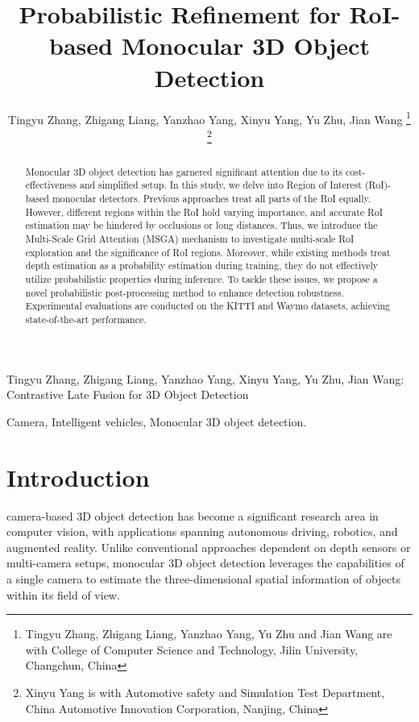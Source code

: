 \documentclass[journal]{IEEEtran}
\begin{document}
	\title{Probabilistic Refinement for RoI-based Monocular 3D Object Detection}
	\author{Tingyu Zhang, Zhigang Liang, Yanzhao Yang, Xinyu Yang, Yu Zhu, Jian Wang
		\thanks{Tingyu Zhang, Zhigang Liang, Yanzhao Yang, Yu Zhu and Jian Wang are with College of Computer Science and Technology, Jilin University, Changchun, China}
		\thanks{Xinyu Yang is with Automotive safety and Simulation Test Department, China Automotive Innovation Corporation, Nanjing, China}}
	
	{Tingyu Zhang, Zhigang Liang, Yanzhao Yang, Xinyu Yang, Yu Zhu, Jian Wang:
		Contrastive Late Fusion for 3D Object Detection}
	
	\maketitle
	
	\begin{abstract}
	Monocular 3D object detection has garnered significant attention due to its cost-effectiveness and simplified setup. In this study, we delve into Region of Interest (RoI)-based monocular detectors. Previous approaches treat all parts of the RoI equally. However, different regions within the RoI hold varying importance, and accurate RoI estimation may be hindered by occlusions or long distances. Thus, we introduce the Multi-Scale Grid Attention (MSGA) mechanism to investigate multi-scale RoI exploration and the significance of RoI regions. Moreover, while existing methods treat depth estimation as a probability estimation during training, they do not effectively utilize probabilistic properties during inference. To tackle these issues, we propose a novel probabilistic post-processing method to enhance detection robustness. Experimental evaluations are conducted on the KITTI and Waymo datasets, achieving state-of-the-art performance.
	\end{abstract}
	
	\begin{IEEEkeywords}
		Camera, Intelligent vehicles, Monocular 3D object detection.
	\end{IEEEkeywords}
	

	\section{Introduction}
	\noindent{} camera-based 3D object detection has become a significant research area in computer vision, with applications spanning autonomous driving, robotics, and augmented reality. Unlike conventional approaches dependent on depth sensors or multi-camera setups, monocular 3D object detection leverages the capabilities of a single camera to estimate the three-dimensional spatial information of objects within its field of view.
	
\end{document}
